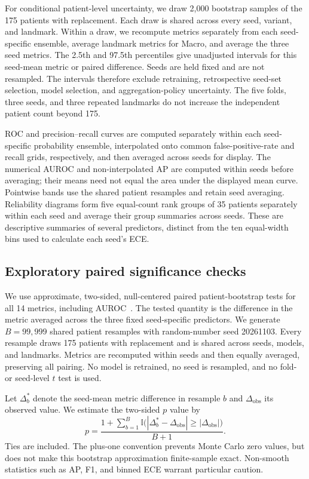 For conditional patient-level uncertainty, we draw 2,000 bootstrap samples of the 175 patients with replacement. Each draw is shared across every seed, variant, and landmark. Within a draw, we recompute metrics separately from each seed-specific ensemble, average landmark metrics for Macro, and average the three seed metrics. The 2.5th and 97.5th percentiles give unadjusted intervals for this seed-mean metric or paired difference. Seeds are held fixed and are not resampled. The intervals therefore exclude retraining, retrospective seed-set selection, model selection, and aggregation-policy uncertainty. The five folds, three seeds, and three repeated landmarks do not increase the independent patient count beyond 175.

ROC and precision--recall curves are computed separately within each seed-specific probability ensemble, interpolated onto common false-positive-rate and recall grids, respectively, and then averaged across seeds for display. The numerical AUROC and non-interpolated AP are computed within seeds before averaging; their means need not equal the area under the displayed mean curve. Pointwise bands use the shared patient resamples and retain seed averaging. Reliability diagrams form five equal-count rank groups of 35 patients separately within each seed and average their group summaries across seeds. These are descriptive summaries of several predictors, distinct from the ten equal-width bins used to calculate each seed's ECE.

\subsection{Exploratory paired significance checks}
We use approximate, two-sided, null-centered paired patient-bootstrap tests for all 14 metrics, including AUROC~\citep{davison1997}. The tested quantity is the difference in the metric averaged across the three fixed seed-specific predictors. We generate $B=99{,}999$ shared patient resamples with random-number seed 20261103. Every resample draws 175 patients with replacement and is shared across seeds, models, and landmarks. Metrics are recomputed within seeds and then equally averaged, preserving all pairing. No model is retrained, no seed is resampled, and no fold- or seed-level $t$ test is used.

Let $\Delta_b^*$ denote the seed-mean metric difference in resample $b$ and $\Delta_{\mathrm{obs}}$ its observed value. We estimate the two-sided $p$ value by
\begin{equation}
 p=\frac{1+\sum_{b=1}^{B}\mathbb{I}\bigl(|\Delta_b^*-\Delta_{\mathrm{obs}}|\geq|\Delta_{\mathrm{obs}}|\bigr)}{B+1}.
\end{equation}
Ties are included. The plus-one convention prevents Monte Carlo zero values, but does not make this bootstrap approximation finite-sample exact. Non-smooth statistics such as AP, F1, and binned ECE warrant particular caution.

